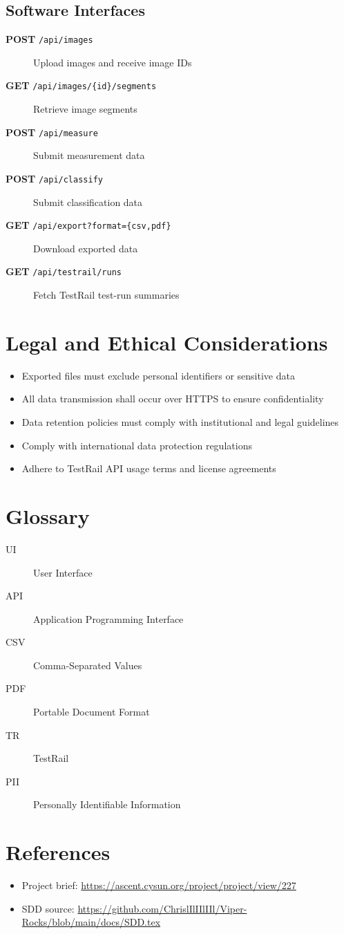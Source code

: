 \documentclass{article}
\begin{document}
\subsection{Software Interfaces}
\begin{description}
  \item[\textbf{POST} \texttt{/api/images}]  Upload images and receive image IDs
  \item[\textbf{GET} \texttt{/api/images/\{id\}/segments}]  Retrieve image segments
  \item[\textbf{POST} \texttt{/api/measure}]  Submit measurement data
  \item[\textbf{POST} \texttt{/api/classify}]  Submit classification data
  \item[\textbf{GET} \texttt{/api/export?format=\{csv,pdf\}}]  Download exported data
  \item[\textbf{GET} \texttt{/api/testrail/runs}]  Fetch TestRail test-run summaries
\end{description}

\section{Legal and Ethical Considerations}
\begin{itemize}
  \item Exported files must exclude personal identifiers or sensitive data
  \item All data transmission shall occur over HTTPS to ensure confidentiality
  \item Data retention policies must comply with institutional and legal guidelines
  \item Comply with international data protection regulations
  \item Adhere to TestRail API usage terms and license agreements
\end{itemize}

\section{Glossary}
\begin{description}
  \item[UI] User Interface
  \item[API] Application Programming Interface
  \item[CSV] Comma-Separated Values
  \item[PDF] Portable Document Format
  \item[TR] TestRail
  \item[PII] Personally Identifiable Information
\end{description}

\section{References}
\begin{itemize}
  \item Project brief: \url{https://ascent.cysun.org/project/project/view/227}
  \item SDD source: \url{https://github.com/ChrislIlIIlIIl/Viper-Rocks/blob/main/docs/SDD.tex}
\end{itemize}
\end{document}
